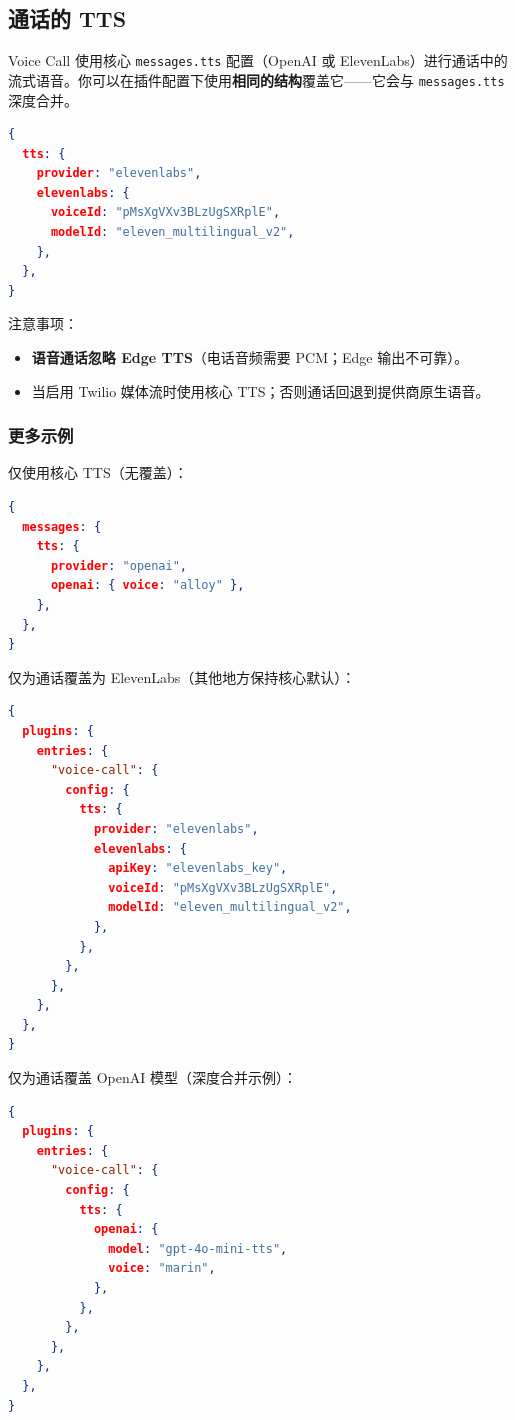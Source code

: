 \subsection{通话的 TTS}


Voice Call 使用核心 \texttt{messages.tts} 配置（OpenAI 或 ElevenLabs）进行通话中的流式语音。你可以在插件配置下使用\textbf{相同的结构}覆盖它——它会与 \texttt{messages.tts} 深度合并。

\begin{lstlisting}[language=json]
{
  tts: {
    provider: "elevenlabs",
    elevenlabs: {
      voiceId: "pMsXgVXv3BLzUgSXRplE",
      modelId: "eleven_multilingual_v2",
    },
  },
}
\end{lstlisting}


注意事项：

\begin{itemize}
  \item \textbf{语音通话忽略 Edge TTS}（电话音频需要 PCM；Edge 输出不可靠）。
  \item 当启用 Twilio 媒体流时使用核心 TTS；否则通话回退到提供商原生语音。
\end{itemize}


\subsubsection{更多示例}


仅使用核心 TTS（无覆盖）：

\begin{lstlisting}[language=json]
{
  messages: {
    tts: {
      provider: "openai",
      openai: { voice: "alloy" },
    },
  },
}
\end{lstlisting}


仅为通话覆盖为 ElevenLabs（其他地方保持核心默认）：

\begin{lstlisting}[language=json]
{
  plugins: {
    entries: {
      "voice-call": {
        config: {
          tts: {
            provider: "elevenlabs",
            elevenlabs: {
              apiKey: "elevenlabs_key",
              voiceId: "pMsXgVXv3BLzUgSXRplE",
              modelId: "eleven_multilingual_v2",
            },
          },
        },
      },
    },
  },
}
\end{lstlisting}


仅为通话覆盖 OpenAI 模型（深度合并示例）：

\begin{lstlisting}[language=json]
{
  plugins: {
    entries: {
      "voice-call": {
        config: {
          tts: {
            openai: {
              model: "gpt-4o-mini-tts",
              voice: "marin",
            },
          },
        },
      },
    },
  },
}
\end{lstlisting}


